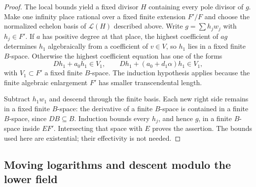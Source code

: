 \documentclass[11pt,a4paper]{article}
\theoremstyle{definition}
\theoremstyle{remark}
\numberwithin{equation}{section}
\begin{document}
\begin{proof}
The local bounds yield a fixed divisor $H$ containing every pole
divisor of $g$.  Make one infinity place rational over a fixed finite
extension $F'/F$ and choose the normalized echelon basis of
$\mathcal L(H)$ described above.  Write $g=\sum h_jw_j$ with
$h_j\in F'$.  If $a$ has positive degree at that place, the highest
coefficient of $ag$ determines $h_1$ algebraically from a coefficient
of $v\in V$, so $h_1$ lies in a fixed finite $B$-space.  Otherwise
the highest coefficient equation has one of the forms
\[
 Dh_1+a_0h_1\in V_1,
 \qquad
 Dh_1+(a_0+d_1\alpha)h_1\in V_1,
\]
with $V_1\subset F'$ a fixed finite $B$-space.  The induction hypothesis
applies because the finite algebraic enlargement $F'$ has smaller
transcendental length.

Subtract $h_1w_1$ and descend through the finite basis.  Each new
right side remains in a fixed finite $B$-space: the derivative of a
finite $B$-space is contained in a finite $B$-space, since $DB\subseteq
B$.  Induction bounds every $h_j$, and hence $g$, in a finite $B$-space
inside $EF'$.  Intersecting that space with $E$ proves the assertion.
The bounds used here are existential; their effectivity is not needed.
\end{proof}

\subsection{Moving logarithms and descent modulo the lower field}
\end{document}

